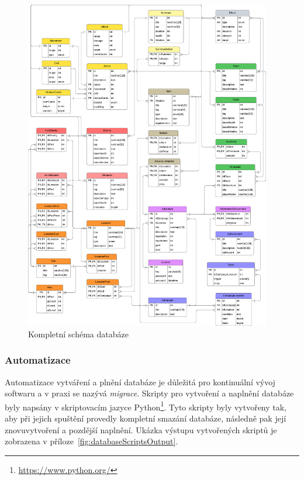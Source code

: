 \begin{figure}[H]
    \centering
    \includegraphics[width=0.96\textwidth]{../../shared/diagrams/dbScheme}
    \caption{Kompletní schéma databáze}
    \label{fig:db_scheme}
\end{figure}

\subsubsection*{Automatizace}
\label{subsubsec:implementation-technologies-database-automatization}
Automatizace vytváření a plnění databáze je důležitá pro kontinuální vývoj softwaru a v praxi se nazývá \textit{migrace}. Skripty pro vytvoření a naplnění databáze byly napsány v skriptovacím jazyce Python\footnote{\href{https://www.python.org/}{https://www.python.org/}}. Tyto skripty byly vytvořeny tak, aby při jejich spuštění provedly kompletní smazání databáze, následně pak její znovuvytvoření a pozdější naplnění. Ukázka výstupu vytvořených skriptů je zobrazena v příloze~\ref{fig:databaseScriptsOutput}.

